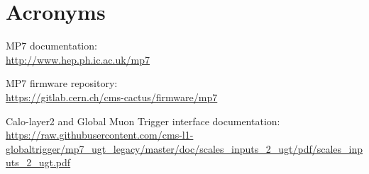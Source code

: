\documentclass[11pt,a4paper,english,titlepage]{article}
\begin{document}
\doctitlepage{}



\doctoc{}

%
% 


% 
% 



% 
% 
% 

\doctables{}

\docfigures{}


%

%
\section*{Acronyms}
\begin{acronym}

\end{acronym}

\clearpage

\begin{thebibliography}{00}

MP7 documentation:\\
\url{http://www.hep.ph.ic.ac.uk/mp7}

MP7 firmware repository:\\
\url{https://gitlab.cern.ch/cms-cactus/firmware/mp7}


Calo-layer2 and Global Muon Trigger interface documentation:\\
\url{https://raw.githubusercontent.com/cms-l1-globaltrigger/mp7_ugt_legacy/master/doc/scales_inputs_2_ugt/pdf/scales_inputs_2_ugt.pdf}

\end{thebibliography}


\end{document}
